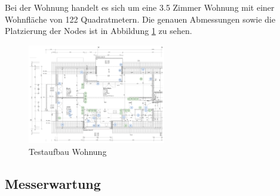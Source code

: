 Bei der Wohnung handelt es sich um eine 3.5 Zimmer Wohnung mit einer Wohnfläche von 122 Quadratmetern. Die genauen Abmessungen sowie die Platzierung der Nodes ist in Abbildung \ref{fig:TestaufbauWohnung} zu sehen.
\begin{figure}[h]
	\centering
	\includegraphics[width=6cm]{graphics/Plan_Wohnung_Cyrill_Nodes_Placement.png}
	\caption{Testaufbau Wohnung}
	\label{fig:TestaufbauWohnung}
\end{figure}


\subsection{Messerwartung}
